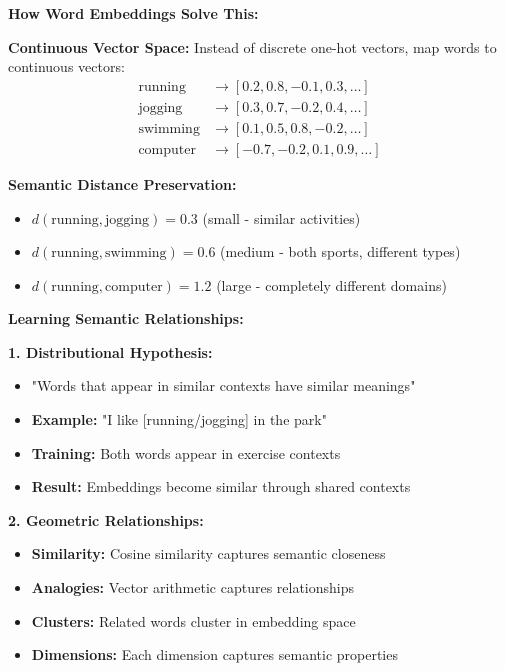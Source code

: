 \documentclass[12pt]{article}
\begin{document}
\begin{enumerate}[(a)]
{    \textbf{How Word Embeddings Solve This:}
    
    \textbf{Continuous Vector Space:}
    Instead of discrete one-hot vectors, map words to continuous vectors:
    \begin{align}
    \text{running} &\rightarrow [0.2, 0.8, -0.1, 0.3, \ldots] \\
    \text{jogging} &\rightarrow [0.3, 0.7, -0.2, 0.4, \ldots] \\
    \text{swimming} &\rightarrow [0.1, 0.5, 0.8, -0.2, \ldots] \\
    \text{computer} &\rightarrow [-0.7, -0.2, 0.1, 0.9, \ldots]
    \end{align}
    
    \textbf{Semantic Distance Preservation:}
    \begin{itemize}
        \item $d(\text{running}, \text{jogging}) = 0.3$ (small - similar activities)
        \item $d(\text{running}, \text{swimming}) = 0.6$ (medium - both sports, different types)
        \item $d(\text{running}, \text{computer}) = 1.2$ (large - completely different domains)
    \end{itemize}
    
    \textbf{Learning Semantic Relationships:}
    
    \textbf{1. Distributional Hypothesis:}
    \begin{itemize}
        \item "Words that appear in similar contexts have similar meanings"
        \item \textbf{Example:} "I like [running/jogging] in the park"
        \item \textbf{Training:} Both words appear in exercise contexts
        \item \textbf{Result:} Embeddings become similar through shared contexts
    \end{itemize}
    
    \textbf{2. Geometric Relationships:}
    \begin{itemize}
        \item \textbf{Similarity:} Cosine similarity captures semantic closeness
        \item \textbf{Analogies:} Vector arithmetic captures relationships
        \item \textbf{Clusters:} Related words cluster in embedding space
        \item \textbf{Dimensions:} Each dimension captures semantic properties
    \end{itemize}
    
}
\end{enumerate}
\end{document}
